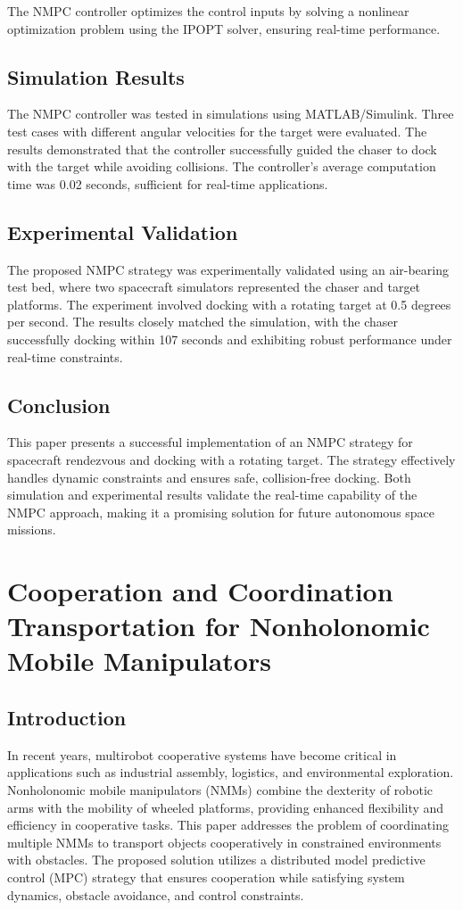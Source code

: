 \documentclass[a4paper,12pt]{article}
\begin{document}
        The NMPC controller optimizes the control inputs by solving a nonlinear optimization problem using the IPOPT solver, ensuring real-time performance.
        
        \subsection{Simulation Results}
        The NMPC controller was tested in simulations using MATLAB/Simulink. Three test cases with different angular velocities for the target were evaluated. The results demonstrated that the controller successfully guided the chaser to dock with the target while avoiding collisions. The controller's average computation time was 0.02 seconds, sufficient for real-time applications.
        
        \subsection{Experimental Validation}
        The proposed NMPC strategy was experimentally validated using an air-bearing test bed, where two spacecraft simulators represented the chaser and target platforms. The experiment involved docking with a rotating target at 0.5 degrees per second. The results closely matched the simulation, with the chaser successfully docking within 107 seconds and exhibiting robust performance under real-time constraints.
        
        \subsection{Conclusion}
        This paper presents a successful implementation of an NMPC strategy for spacecraft rendezvous and docking with a rotating target. The strategy effectively handles dynamic constraints and ensures safe, collision-free docking. Both simulation and experimental results validate the real-time capability of the NMPC approach, making it a promising solution for future autonomous space missions.

    \section{Cooperation and Coordination Transportation for Nonholonomic Mobile Manipulators}

        \subsection{Introduction}
        In recent years, multirobot cooperative systems have become critical in applications such as industrial assembly, logistics, and environmental exploration. Nonholonomic mobile manipulators (NMMs) combine the dexterity of robotic arms with the mobility of wheeled platforms, providing enhanced flexibility and efficiency in cooperative tasks. This paper addresses the problem of coordinating multiple NMMs to transport objects cooperatively in constrained environments with obstacles. The proposed solution utilizes a distributed model predictive control (MPC) strategy that ensures cooperation while satisfying system dynamics, obstacle avoidance, and control constraints.
        
\end{document}
